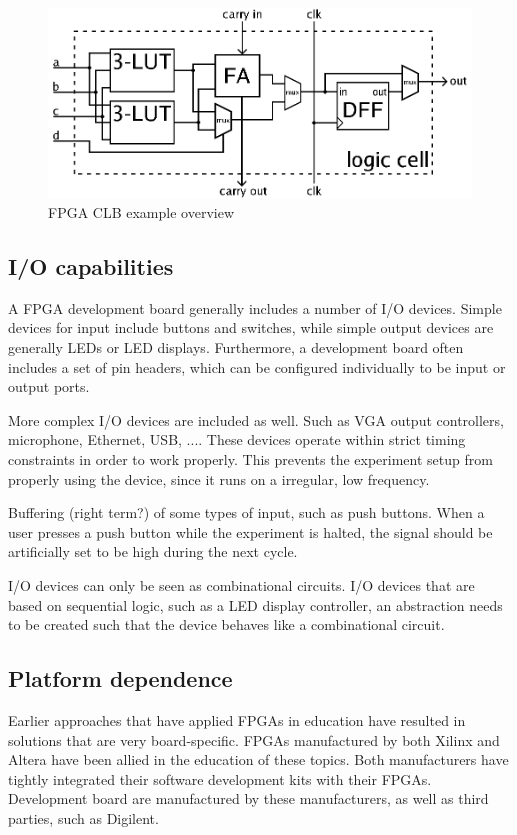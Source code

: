 \documentclass[openright]{template/uva-bachelor-thesis}
\begin{document}
\begin{figure}
\centering
\includegraphics[width=.7\textwidth]{img/fpga-clb}
\caption{FPGA CLB example overview \cite{fpgaclbimg}}
\label{fig:my_label}
\end{figure}



\subsection{I/O capabilities}
A FPGA development board generally includes a number of I/O devices. Simple devices for input include buttons and switches, while simple output devices are generally LEDs or LED displays. Furthermore, a development board often includes a set of pin headers, which can be configured individually to be input or output ports. 

More complex I/O devices are included as well. Such as VGA output controllers, microphone, Ethernet, USB, .... These devices operate within strict timing constraints in order to work properly. This prevents the experiment setup from properly using the device, since it runs on a irregular, low frequency. 

Buffering (right term?) of some types of input, such as push buttons. When a user presses a push button while the experiment is halted, the signal should be artificially set to be high during the next cycle.

I/O devices can only be seen as combinational circuits. I/O devices that are based on sequential logic, such as a LED display controller, an abstraction needs to be created such that the device behaves like a combinational circuit. 

\subsection{Platform dependence}
Earlier approaches that have applied FPGAs in education have resulted in solutions that are very board-specific. FPGAs manufactured by both Xilinx and Altera have been allied in the education of these topics. Both manufacturers have tightly integrated their software development kits with their FPGAs. Development board are manufactured by these manufacturers, as well as third parties, such as Digilent. 
\end{document}
